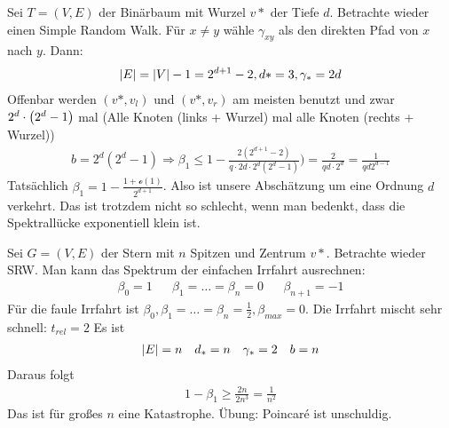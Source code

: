 \begin{beispiel}[Binärbaum]
	Sei $T = (V,E)$ der Binärbaum mit Wurzel $v*$ der Tiefe $d$. Betrachte wieder einen Simple Random Walk. Für $x \neq y$ wähle $\gamma_{xy}$ als den direkten Pfad von $x$ nach $y$. Dann:
	\begin{align}
		\lvert E\rvert = \lvert V\rvert -1 = 2^{d+1} - 2, d* = 3, \gamma_* = 2d
	\end{align}
	Offenbar werden $(v*,v_l)$ und $(v*,v_r)$ am meisten benutzt  und zwar $2^d \cdot \left(2^d-1\right)$ mal (Alle Knoten (links + Wurzel) mal alle Knoten (rechts + Wurzel))
	\begin{align}
		b = 2^d(2^d-1) \Rightarrow \beta_1 \leq 1- \frac{2(2^{d+1} -2)}{q \cdot 2d \cdot 2^d(2^d-1)}) = \frac{2}{q d \cdot 2^d} = \frac{1}{q d 2^{d-1}}
	\end{align}
	Tatsächlich $\beta_1 = 1- \frac{1+ \mathcal{o}(1)}{2^{d+1}}$. Also ist unsere Abschätzung um eine Ordnung $d$ verkehrt. Das ist trotzdem nicht so schlecht, wenn man bedenkt, dass die Spektrallücke exponentiell klein ist.	
\end{beispiel}
\begin{beispiel}

	Sei $G = (V,E)$ der Stern mit $n$ Spitzen und Zentrum $v*$. Betrachte wieder SRW. Man kann das Spektrum der einfachen Irrfahrt ausrechnen:
	\begin{align}
		\beta_0  = 1 && \beta_1 = \dots = \beta_n = 0 &&  \beta_{n+1} = -1
	\end{align}
	Für die faule Irrfahrt ist $\beta_0, \beta_1 = \dots = \beta_n = \frac{1}{2}, \beta_{max} = 0$. Die Irrfahrt mischt sehr schnell: $t_{rel} = 2$ Es ist
	\begin{align}
		\lvert E\rvert = n && d_* = n && \gamma_* = 2 && b = n 
	\end{align}
	Daraus folgt
	\begin{align}
		1 - \beta_1 \geq \frac{2n}{2n^3}= \frac{1}{n^2}
	\end{align}
	Das ist für großes $n$ eine Katastrophe. Übung: Poincaré ist unschuldig.
\end{beispiel}


